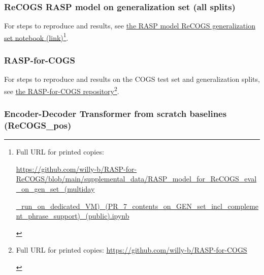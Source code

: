 \documentclass[11pt]{article}
\begin{document}
\subsubsection{ReCOGS RASP model on generalization set (all splits)}
For steps to reproduce and results, see 
\href{https://github.com/willy-b/RASP-for-ReCOGS/blob/main/supplemental\_data/RASP\_model\_for\_ReCOGS\_eval\_on\_gen\_set\_(multiday\_run\_on\_dedicated\_VM)\_(PR\_7\_contents\_on\_GEN\_set\_incl\_complement\_phrase\_support)\_(public).ipynb}{the RASP model ReCOGS generalization set notebook (link)}\footnote{\begin{tiny}Full URL for printed copies: 

\href{https://github.com/willy-b/RASP-for-ReCOGS/blob/main/supplemental\_data/RASP\_model\_for\_ReCOGS\_eval\_on\_gen\_set\_(multiday\_run\_on\_dedicated\_VM)\_(PR\_7\_contents\_on\_GEN\_set\_incl\_complement\_phrase\_support)\_(public).ipynb}{https://github.com/willy-b/RASP-for-ReCOGS/blob/main/supplemental\_data/RASP\_model\_for\_ReCOGS\_eval\_on\_gen\_set\_(multiday}

\href{https://github.com/willy-b/RASP-for-ReCOGS/blob/main/supplemental\_data/RASP\_model\_for\_ReCOGS\_eval\_on\_gen\_set\_(multiday\_run\_on\_dedicated\_VM)\_(PR\_7\_contents\_on\_GEN\_set\_incl\_complement\_phrase\_support)\_(public).ipynb}{\_run\_on\_dedicated\_VM)\_(PR\_7\_contents\_on\_GEN\_set\_incl\_complement\_phrase\_support)\_(public).ipynb}\end{tiny}}.

\subsubsection{RASP-for-COGS}

For steps to reproduce and results on the COGS test set and generalization splits, see \href{https://github.com/willy-b/RASP-for-COGS}{the RASP-for-COGS repository}\footnote{\begin{tiny}Full URL for printed copies: \href{https://github.com/willy-b/RASP-for-COGS}{https://github.com/willy-b/RASP-for-COGS}\end{tiny}}.

\subsubsection{\citep{Wu2023} Encoder-Decoder Transformer from scratch baselines (ReCOGS\_pos)}
\end{document}
